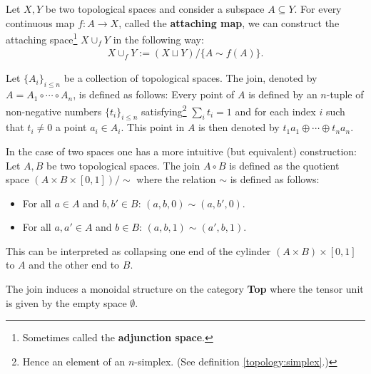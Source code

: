     \begin{construct}\label{topology:attaching_space}
        Let $X, Y$ be two topological spaces and consider a subspace $A\subseteq Y$. For every continuous map $f:A\rightarrow X$, called the \textbf{attaching map}, we can construct the attaching space\footnote{Sometimes called the \textbf{adjunction space}.} $X\cup_f Y$ in the following way:
        \begin{gather}
            X\cup_f Y := (X\sqcup Y)/\{A\sim f(A)\}.
        \end{gather}
    \end{construct}

    \begin{construct}[Join]
        Let $\{A_i\}_{i\leq n}$ be a collection of topological spaces. The join, denoted by $A=A_1\circ\cdots\circ A_n$, is defined as follows: Every point of $A$ is defined by an $n$-tuple of non-negative numbers $\{t_i\}_{i\leq n}$ satisfying\footnote{Hence an element of an $n$-simplex. (See definition \ref{topology:simplex}.)} $\sum_it_i=1$ and for each index $i$ such that $t_i\neq 0$ a point $a_i\in A_i$. This point in $A$ is then denoted by $t_1a_1\oplus\cdots\oplus t_na_n$.

        In the case of two spaces one has a more intuitive (but equivalent) construction: Let $A, B$ be two topological spaces. The join $A\circ B$ is defined as the quotient space $(A\times B\times [0, 1])/\sim$ where the relation $\sim$ is defined as follows:
        \begin{itemize}
            \item For all $a\in A$ and $b, b'\in B$: $(a, b, 0)\sim(a, b', 0)$.
            \item For all $a, a'\in A$ and $b\in B$: $(a, b, 1)\sim(a', b, 1)$.
        \end{itemize}
        This can be interpreted as collapsing one end of the cylinder $(A\times B)\times[0, 1]$ to $A$ and the other end to $B$.
    \end{construct}
    \begin{property}
        The join induces a monoidal structure on the category \textbf{Top} where the tensor unit is given by the empty space $\emptyset$.
    \end{property}


